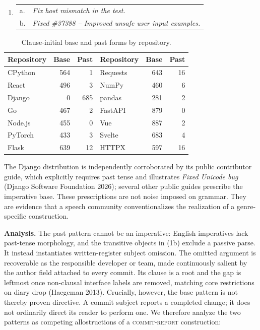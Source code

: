 \documentclass[12pt]{article}
\newcommand{\ex}[1]{\textit{#1}}
\begin{document}
\begin{enumerate}[label=(\arabic*),leftmargin=2.2em,itemsep=0pt,topsep=2pt]
\item \begin{tabular}[t]{@{}ll@{}}
a. & \ex{Fix host mismatch in the test.}\\
b. & \ex{Fixed \#37388 -- Improved unsafe user input examples.}
\end{tabular}
\end{enumerate}
\vspace{-0.4em}

\begin{table}[h]
\centering
\caption{Clause-initial base and past forms by repository.}
\label{tab:repos}
\vspace{-0.35em}
\begin{tabular}{@{}lrr@{\hspace{1.35em}}lrr@{}}
\toprule
Repository & Base & Past & Repository & Base & Past\\
\midrule
CPython  & 564 & 1  & Requests & 643 & 16\\
React    & 496 & 3  & NumPy    & 460 & 6\\
Django   & 0   & 685& pandas   & 281 & 2\\
Go       & 467 & 2  & FastAPI  & 879 & 0\\
Node.js  & 455 & 0  & Vue      & 887 & 2\\
PyTorch  & 433 & 3  & Svelte   & 683 & 4\\
Flask    & 639 & 12 & HTTPX    & 597 & 16\\
\bottomrule
\end{tabular}
\end{table}
\vspace{-0.65em}

The Django distribution is independently corroborated by its public contributor
guide, which explicitly requires past tense and illustrates \ex{Fixed Unicode
bug} (Django Software Foundation 2026); several other public guides prescribe the
imperative base. These prescriptions are not noise imposed on grammar.
They are evidence that a speech community conventionalizes the realization of
a genre-specific construction.

\newpage
\textbf{Analysis.}
The past pattern cannot be an imperative: English imperatives lack past-tense
morphology, and the transitive objects in (1b) exclude a passive parse. It
instead instantiates written-register subject omission. The omitted argument
is recoverable as the responsible developer or team, made continuously salient
by the author field attached to every commit. Its clause is a root and the
gap is leftmost once non-clausal interface labels are removed, matching core
restrictions on diary drop (Haegeman 2013). Crucially, however, the
base pattern is not thereby proven directive. A commit subject reports a
completed change; it does not ordinarily direct its reader to perform one.
We therefore analyze the two patterns as competing allostructions of a
\textsc{commit-report} construction:
\end{document}
